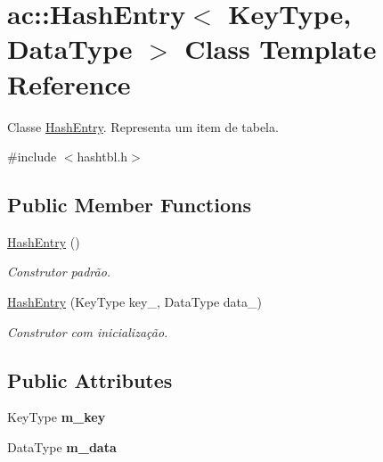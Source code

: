 \hypertarget{classac_1_1_hash_entry}{}\section{ac\+:\+:Hash\+Entry$<$ Key\+Type, Data\+Type $>$ Class Template Reference}
\label{classac_1_1_hash_entry}


Classe \hyperlink{classac_1_1_hash_entry}{Hash\+Entry}. Representa um item de tabela.  




{\ttfamily \#include $<$hashtbl.\+h$>$}

\subsection*{Public Member Functions}
\begin{DoxyCompactItemize}
\item 
\mbox{\label{classac_1_1_hash_entry_a2f81d60daf9791e867e3cf7baeec341d}} 
\hyperlink{classac_1_1_hash_entry_a2f81d60daf9791e867e3cf7baeec341d}{Hash\+Entry} ()
\begin{DoxyCompactList}\small\item\em Construtor padrão. \end{DoxyCompactList}\item 
\mbox{\label{classac_1_1_hash_entry_a40ed90ccea5e6de19fee08e260c27e1a}} 
\hyperlink{classac_1_1_hash_entry_a40ed90ccea5e6de19fee08e260c27e1a}{Hash\+Entry} (Key\+Type key\+\_\+, Data\+Type data\+\_\+)
\begin{DoxyCompactList}\small\item\em Construtor com inicialização. \end{DoxyCompactList}\end{DoxyCompactItemize}
\subsection*{Public Attributes}
\begin{DoxyCompactItemize}
\item 
\mbox{\label{classac_1_1_hash_entry_a8fbb44b97c85a8b5f3894cb99fa8b18a}} 
Key\+Type {\bfseries m\+\_\+key}
\item 
\mbox{\label{classac_1_1_hash_entry_aff3da91af62ba88e418dfa046e0432cf}} 
Data\+Type {\bfseries m\+\_\+data}
\end{DoxyCompactItemize}


